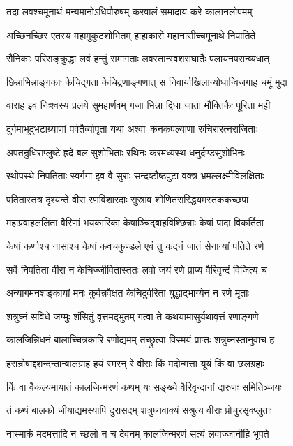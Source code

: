 \twolineshloka
{तदा लवश्चमूनाथं मन्यमानोऽधिपौरुषम्}
{करवालं समादाय करे कालानलोपमम्}%

\twolineshloka
{अच्छिनच्छिर एतस्य महामुकुटशोभितम्}
{हाहाकारो महानासीच्चमूनाथे निपातिते}%

\twolineshloka
{सैनिकाः परिसङ्क्रुद्धा लवं हन्तुं समागताः}
{लवस्तान्स्वशराघातैः पलायनपरान्व्यधात्}%

\twolineshloka
{छिन्नाभिन्नाङ्गकाः केचिद्गता केचिद्रणाङ्गणात्}
{स निवार्याखिलान्योधान्विजगाह चमूं मुदा}%

\twolineshloka
{वाराह इव निःश्वस्य प्रलये सुमहार्णवम्}
{गजा भिन्ना द्विधा जाता मौक्तिकैः पूरिता मही}%

\twolineshloka
{दुर्गमाभूद्भटाग्र्याणां पर्वतैर्व्यापृता यथा}
{अश्वाः कनकपल्याणा रुचिरारत्नराजिताः}%

\twolineshloka
{अपतन्रुधिराप्लुष्टे ह्रदे बल सुशोभिताः}
{रथिनः करमध्यस्थ धनुर्दण्डसुशोभिनः}%

\twolineshloka
{रथोपस्थे निपतिताः स्वर्गगा इव वै सुराः}
{सन्दष्टौष्ठपुटा वक्त्र भ्रमल्लक्ष्मीविलक्षिताः}%

\twolineshloka
{पतितास्तत्र दृश्यन्ते वीरा रणविशारदाः}
{सुस्राव शोणितसरिद्धयमस्तककच्छपा}%

\twolineshloka
{महाप्रवाहललिता वैरिणां भयकारिका}
{केषाञ्चिद्बाहविश्छिन्नाः केषां पादा विकर्तिता}%

\twolineshloka
{केषां कर्णाश्च नासाश्च केषां कवचकुण्डले}
{एवं तु कदनं जातं सेनान्यां पतिते रणे}%

\twolineshloka
{सर्वे निपतिता वीरा न केचिज्जीवितास्ततः}
{लवो जयं रणे प्राप्य वैरिवृन्दं विजित्य च}%

\twolineshloka
{अन्यागमनशङ्कायां मनः कुर्वन्नवैक्षत}
{केचिदुर्वरिता युद्धाद्भाग्येन न रणे मृताः}%

\twolineshloka
{शत्रुघ्नं सविधे जग्मुः शंसितुं वृत्तमद्भुतम्}
{गत्वा ते कथयामासुर्यथावृत्तं रणाङ्गणे}%

\twolineshloka
{कालजिन्निधनं बालाच्चित्रकारि रणोद्यमम्}
{तच्छ्रुत्वा विस्मयं प्राप्तः शत्रुघ्नस्तानुवाच ह}%

\twolineshloka
{हसन्रोषाद्दशन्दन्तान्बालग्राह हयं स्मरन्}
{रे वीराः किं मदोन्मत्ता यूयं किं वा छलग्रहाः}%

\twolineshloka
{किं वा वैकल्यमायातं कालजिन्मरणं कथम्}
{यः सङ्ख्ये वैरिवृन्दानां दारुणः समितिञ्जयः}%

\twolineshloka
{तं कथं बालको जीयाद्यमस्यापि दुरासदम्}
{शत्रुघ्नवाक्यं संश्रुत्य वीराः प्रोचुरसृक्प्लुताः}%

\twolineshloka
{नास्माकं मदमत्तादि न च्छलो न च देवनम्}
{कालजिन्मरणं सत्यं लवाज्जानीहि भूपते}%

